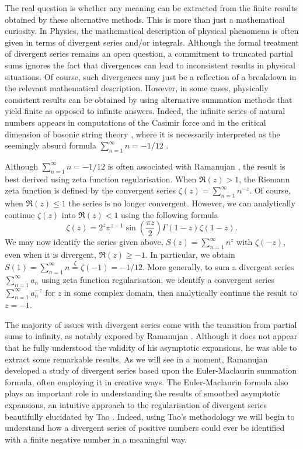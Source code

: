\documentclass[11pt, letter]{article}
\begin{document}
 The real question is whether any meaning can  be extracted from the finite results obtained by these alternative methods. This is more than just a mathematical curiosity. In Physics, the mathematical description of  physical phenomena is often given in terms of divergent series and/or integrals. Although the formal treatment of divergent series remains an open question, a  commitment to truncated partial sums ignores the fact that divergences can lead to inconsistent results in physical situations. Of course, such divergences may just be a reflection of a breakdown in the relevant mathematical description. However, in some cases, physically consistent results can be obtained by using alternative summation methods that yield finite  as opposed to infinite answers. Indeed, the infinite series of natural numbers appears in computations of the Casimir force \cite{Schwartz14} and in the critical dimension of bosonic string theory \cite{Polchinski98}, where it is necessarily interpreted as the seemingly absurd formula $\sum_{n=1}^\infty n = -1/12$ \citep{Hardy73,Berndt85}. 
 
 Although  $\sum_{n=1}^\infty n = -1/12$ is often associated with Ramanujan \cite{Berndt85}, the result is best derived using zeta function regularisation.  When $\Re(z)>1$, the Riemann zeta function is defined by the convergent series $\zeta(z)=\sum_{n=1}^\infty n^{-z}$. Of course, when $\Re(z) \leq 1$ the series is no longer convergent. However, we can analytically continue $\zeta(z)$ into $\Re(z)<1$ using the following formula
 $$
 \zeta(z)=2^z \pi^{z-1} \sin\left(\frac{\pi z}{2} \right) \Gamma(1-z) \zeta(1-z).
 $$
 We may now identify the series given above,  $S(z)=\sum_{n=1}^\infty n^{z}$ with $\zeta(-z)$, even when it is divergent, $\Re(z)\geq -1$.  In particular,  we obtain $S(1)=\sum_{n=1}^\infty n \overset{\zeta}{=}\zeta(-1)=-1/12$.  More generally, to sum a divergent series $\sum_{n=1}^\infty a_n$ using zeta function regularisation, we identify a convergent series $\sum_{n=1}^\infty a_n^{-z}$ for $z$ in some complex domain, then analytically continue the result to $z=-1$. 



The majority of issues with divergent series come with the transition from partial sums to infinity, as notably exposed by Ramanujan \citep{Berndt85,Hardy73}. Although it does not appear that he  fully understood the validity of his  asymptotic expansions, he was able to extract some remarkable results. As we will see in a moment,  Ramanujan developed a study of divergent series based upon the Euler-Maclaurin summation formula, often employing it in creative ways.  The Euler-Maclaurin formula also plays an important role in understanding the results of smoothed asymptotic expansions, an intuitive approach to the regularisation of divergent series beautifully elucidated by Tao \citep{Tao11}. Indeed, using Tao's methodology we will begin to understand how a divergent series of positive numbers could ever be identified with a finite negative number in a meaningful way. 
\end{document}

